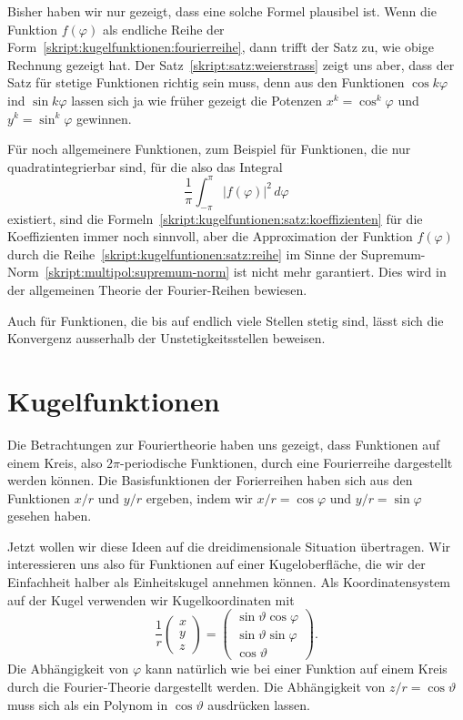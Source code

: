 Bisher haben wir nur gezeigt, dass eine solche Formel plausibel ist.
Wenn die Funktion $f(\varphi)$ als endliche Reihe der
Form~\eqref{skript:kugelfunktionen:fourierreihe}, dann trifft der
Satz zu, wie obige Rechnung gezeigt hat.
Der Satz~\ref{skript:satz:weierstrass} zeigt uns aber, dass der
Satz für stetige Funktionen richtig sein muss, denn aus den Funktionen
$\cos k\varphi$ ind $\sin k\varphi$ lassen sich ja wie früher gezeigt
die Potenzen
$x^k=\cos^k\varphi$ und $y^k=\sin^k\varphi$ gewinnen.

Für noch allgemeinere Funktionen, zum Beispiel für Funktionen, die
nur quadratintegrierbar sind, für die also das Integral
\[
\frac1{\pi}
\int_{-\pi}^{\pi} |f(\varphi)|^2\,d\varphi
\]
existiert, sind die 
Formeln~\eqref{skript:kugelfuntionen:satz:koeffizienten}
für die Koeffizienten immer noch sinnvoll, aber die Approximation
der Funktion $f(\varphi)$ durch die
Reihe~\eqref{skript:kugelfuntionen:satz:reihe}
im Sinne der Supremum-Norm~\eqref{skript:multipol:supremum-norm}
ist nicht mehr garantiert.
Dies wird in der allgemeinen Theorie der Fourier-Reihen bewiesen.

Auch für Funktionen, die bis auf endlich viele Stellen stetig sind,
lässt sich die Konvergenz ausserhalb der Unstetigkeitsstellen beweisen.

\section{Kugelfunktionen}
Die Betrachtungen zur Fouriertheorie haben uns gezeigt, dass Funktionen
auf einem Kreis, also $2\pi$-periodische Funktionen, durch eine
Fourierreihe dargestellt werden können.
Die Basisfunktionen der Forierreihen haben sich aus den
Funktionen $x/r$ und $y/r$ ergeben, indem wir $x/r=\cos\varphi$
und $y/r=\sin\varphi$ gesehen haben.

Jetzt wollen wir diese Ideen auf die dreidimensionale Situation
übertragen.
Wir interessieren uns also für Funktionen auf einer Kugeloberfläche,
die wir der Einfachheit halber als Einheitskugel annehmen können.
Als Koordinatensystem auf der Kugel verwenden wir Kugelkoordinaten mit
\begin{equation}
\frac1r
\begin{pmatrix}
x\\y\\z
\end{pmatrix}
=
\begin{pmatrix}
\sin\vartheta\cos\varphi\\
\sin\vartheta\sin\varphi\\
\cos\vartheta
\end{pmatrix}.
\end{equation}
Die Abhängigkeit von $\varphi$ kann natürlich wie bei einer Funktion
auf einem Kreis durch die Fourier-Theorie dargestellt werden.
Die Abhängigkeit von $z/r=\cos\vartheta$ muss sich als ein Polynom
in $\cos\vartheta$ ausdrücken lassen.

